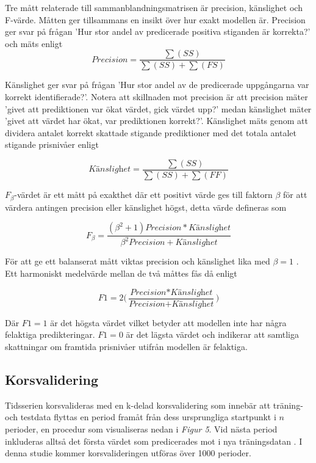 \documentclass[11pt]{article}
\begin{document}
Tre mått relaterade till sammanblandningsmatrisen är precision, känslighet och F-värde. Måtten ger tillsammans en insikt över hur exakt modellen är. Precision ger svar på frågan 'Hur stor andel av predicerade positiva stiganden är korrekta?' och mäts enligt
\begin{equation}
    \textit{Precision} = \frac{\sum(SS)}{\sum(SS)+\sum(FS)} 
\end{equation}

Känslighet ger svar på frågan 'Hur stor andel av de predicerade uppgångarna var korrekt identifierade?'. Notera att skillnaden mot precision är att precision mäter 'givet att prediktionen var ökat värdet, gick värdet upp?' medan känslighet mäter 'givet att värdet har ökat, var prediktionen korrekt?'. Känslighet mäts genom att dividera antalet korrekt skattade stigande prediktioner med det totala antalet stigande prisnivåer enligt

\begin{equation}
    \textit{Känslighet} = \frac{\sum(SS)}{\sum(SS)+\sum(FF)}
\end{equation}

$F_{\beta}$-värdet är ett mått på exakthet där ett positivt värde ges till faktorn $\beta$ för att värdera antingen precision eller känslighet högst, detta värde defineras som

\begin{equation}
    F_{\beta} = \frac{(\beta^2+1) \textit{Precision} * 
    \textit{Känslighet}}{\beta^2  \textit{Precision} + \textit{Känslighet}}
\end{equation}

För att ge ett balanserat mått viktas precision och känslighet lika med $\beta=1$ \parencite{ModelValidation}. Ett harmoniskt medelvärde mellan de två måttes fås då enligt

\begin{equation}
    \textit{F1} = 2 \Big( \frac{\textit{Precision} * \textit{Känslighet}}{\textit{Precision} + \textit{Känslighet}} \Big)
\end{equation}

Där $F1=1$ är det högsta värdet vilket betyder att modellen inte har några felaktiga predikteringar. $F1=0$ är det lägsta värdet och indikerar att samtliga skattningar om framtida prisnivåer utifrån modellen är felaktiga.


\subsection{Korsvalidering}
Tidsserien korsvalideras med en k-delad korsvalidering som innebär att träning- och testdata flyttas en period framåt från dess ursprungliga startpunkt i $n$ perioder, en procedur som visualiseras nedan i \emph{Figur 5}. Vid nästa period inkluderas alltså det första värdet som predicerades mot i nya träningsdatan \parencite{bergmeir2018note}. I denna studie kommer korsvalideringen utföras över 1000 perioder. 
\end{document}
